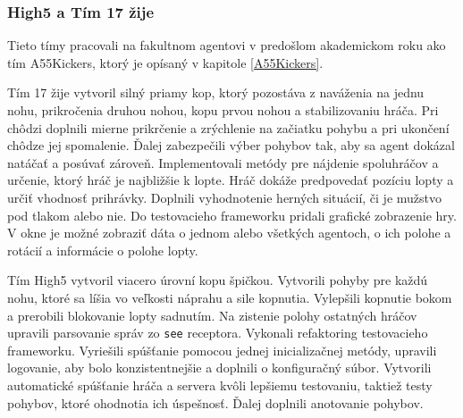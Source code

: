 \subsubsection{High5 a Tím 17 žije}

Tieto tímy pracovali na fakultnom agentovi v predošlom akademickom roku ako tím A55Kickers, ktorý je opísaný v kapitole \ref{A55Kickers}.

Tím 17 žije\cite{tim17zije} vytvoril silný priamy kop, ktorý pozostáva z naváženia na jednu nohu, prikročenia druhou nohou, kopu prvou nohou a stabilizovaniu hráča. Pri chôdzi doplnili mierne prikrčenie a zrýchlenie na začiatku pohybu a pri ukončení chôdze jej spomalenie. Ďalej zabezpečili výber pohybov tak, aby sa agent dokázal natáčať a posúvať zároveň. Implementovali metódy pre nájdenie spoluhráčov a určenie, ktorý hráč je najbližšie k lopte. Hráč dokáže predpovedať pozíciu lopty a určiť vhodnosť prihrávky. Doplnili vyhodnotenie herných situácií, či je mužstvo pod tlakom alebo nie. Do testovacieho frameworku pridali grafické zobrazenie hry. V okne je možné zobraziť dáta o jednom alebo všetkých agentoch, o ich polohe a rotácií a informácie o polohe lopty.

Tím High5\cite{high5} vytvoril viacero úrovní kopu špičkou. Vytvorili pohyby pre každú nohu, ktoré sa líšia vo veľkosti náprahu a sile kopnutia. Vylepšili kopnutie bokom a prerobili blokovanie lopty sadnutím. Na zistenie polohy ostatných hráčov upravili parsovanie správ zo \texttt{see} receptora. Vykonali refaktoring testovacieho frameworku. Vyriešili spúšťanie pomocou jednej inicializačnej metódy, upravili logovanie, aby bolo konzistentnejšie a doplnili o konfiguračný súbor. Vytvorili automatické spúšťanie hráča a servera kvôli lepšiemu testovaniu, taktiež testy pohybov, ktoré ohodnotia ich úspešnosť. Ďalej doplnili anotovanie pohybov.